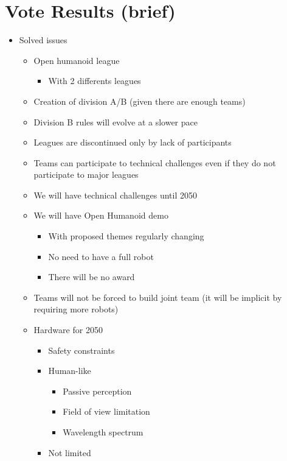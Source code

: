 \documentclass{article}
\begin{document}
\section{Vote Results (brief)}

\begin{itemize} 
   \item Solved issues
   \begin{itemize} 
       \item Open humanoid league
       \begin{itemize} 
           \item With 2 differents leagues
   \end{itemize}
       \item Creation of division A/B (given there are enough teams)
       \item Division B rules will evolve at a slower pace
       \item Leagues are discontinued only by lack of participants
       \item Teams can participate to technical challenges even if they do not participate to major leagues
       \item We will have technical challenges until 2050
       \item We will have Open Humanoid demo
       \begin{itemize} 
           \item With proposed themes regularly changing
           \item No need to have a full robot
           \item There will be no award
   \end{itemize}
       \item Teams will not be forced to build joint team (it will be implicit by requiring more robots)
       \item Hardware for 2050
       \begin{itemize} 
           \item Safety constraints
           \item Human-like
           \begin{itemize} 
               \item Passive perception
               \item Field of view limitation
               \item Wavelength spectrum
       \end{itemize}
           \item Not limited
           \begin{itemize} 

\end{itemize}
\end{itemize}
\end{itemize}
\end{itemize}
\end{document}
